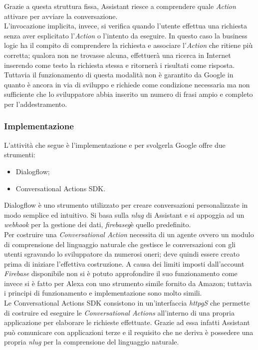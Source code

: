 		Grazie a questa struttura fissa, Assistant riesce a comprendere quale \emph{Action} attivare per avviare la conversazione. \\
		L'invocazione implicita, invece, si verifica quando l'utente effettua una richiesta senza aver esplicitato l'\emph{Action} o l'intento da eseguire. In questo caso la business logic ha il compito di comprendere la richiesta e associare l'\emph{Action} che ritiene più corretta; qualora non ne trovasse alcuna, effettuerà una ricerca in Internet inserendo come testo la richiesta stessa e ritornerà i risultati come risposta. Tuttavia il funzionamento di questa modalità non è garantito da Google in quanto è ancora in via di sviluppo e richiede come condizione necessaria ma non sufficiente che lo sviluppatore abbia inserito un numero di frasi ampio e completo per l'addestramento.
		\subsubsection{Implementazione}
		L'attività che segue è l'implementazione e per svolgerla Google offre due strumenti:
		\begin{itemize}
			\item Dialogflow;
			\item Conversational Actions SDK.
		\end{itemize}
		Dialogflow è uno strumento utilizzato per creare conversazioni personalizzate in modo semplice ed intuitivo. Si basa sulla \emph{\gls{nlug}} di Assistant e si appoggia ad un \emph{webhook} per la gestione dei dati, \emph{\gls{firebaseg}}\glsfirstoccur è quello predefinito. \\
		Per costruire una \emph{Conversational Action} necessita di un agente ovvero un modulo di comprensione del linguaggio naturale che gestisce le conversazioni con gli utenti sgravando lo sviluppatore da numerosi oneri; deve quindi essere creato prima di iniziare l'effettiva costruzione. A causa dei limiti imposti dall'account \emph{Firebase} disponibile non si è potuto approfondire il suo funzionamento come invece si è fatto per Alexa con uno strumento simile fornito da Amazon; tuttavia i principi di funzionamento e implementazione sono molto simili. \\
		Le Conversational Actions SDK consistono in un'interfaccia \emph{\gls{httpg}S} che permette di costruire ed eseguire le \emph{Conversational Actions} all'interno di una propria applicazione per elaborare le richieste effettuate. Grazie ad essa infatti Assistant può comunicare con applicazioni terze e il requisito che ne deriva è possedere una propria \emph{\gls{nlug}} per la comprensione del linguaggio naturale. \\
